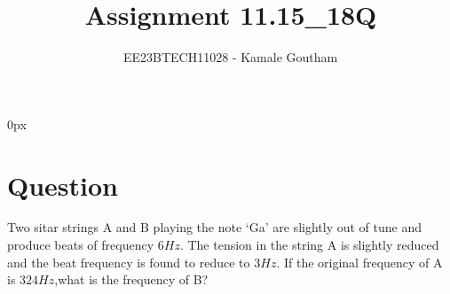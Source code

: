 \documentclass[journal,12pt,twocolumn]{IEEEtran}
\begin{document}
\parindent 0px

\title{Assignment 11.15\_18Q}
\author{EE23BTECH11028 - Kamale Goutham$^{}$%
}
\maketitle
\newpage
\bigskip
\section*{Question}
Two sitar strings A and B playing the note ‘Ga’ are slightly out of tune and produce beats of frequency $6 Hz$. The tension in the string A is slightly reduced and the beat frequency is found to reduce to $3 Hz$. If the original frequency of A is $324 Hz$,what is the frequency of B?\\
\end{document}
